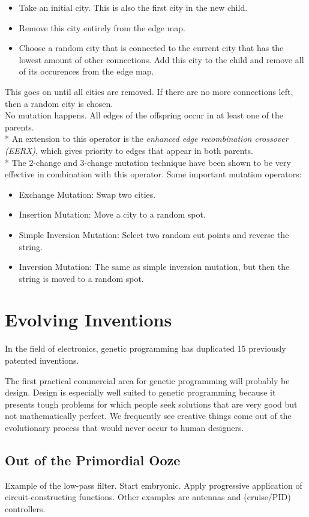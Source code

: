\documentclass[12pt]{article}
\begin{document}
\begin{itemize}
\begin{itemize}
\item Take an initial city. This is also the first city in the new child.
\item Remove this city entirely from the edge map.
\item Choose a random city that is connected to the current city that has the lowest amount of other connections. Add this city to the child and remove all of its occurences from the edge map.
\end{itemize}
This goes on until all cities are removed. If there are no more connections left, then a random city is chosen.\\
No mutation happens. All edges of the offspring occur in at least one of the parents.\\*
An extension to this operator is the \textit{enhanced edge recombination crossover (EERX)}, which gives priority to edges that appear in both parents.\\*
The $2$-change and $3$-change mutation technique have been shown to be very effective in combination with this operator. Some important mutation operators:
\begin{itemize}
\item Exchange Mutation: Swap two cities.
\item Insertion Mutation: Move a city to a random spot.
\item Simple Inversion Mutation: Select two random cut points and reverse the string.
\item Inversion Mutation: The same as simple inversion mutation, but then the string is moved to a random spot.
\end{itemize}
\end{itemize}
\clearpage

\appendix
\section{Evolving Inventions}
In the field of electronics, genetic programming has duplicated 15 previously patented inventions.

The first practical commercial area for genetic programming will probably be design. Design is especially well suited to genetic programming because it presents tough problems for which people seek solutions that are very good but not mathematically perfect. We frequently see creative things come out of the evolutionary process that would never occur to human designers.

\subsection{Out of the Primordial Ooze}
Example of the low-pass filter. Start embryonic. Apply progressive application of circuit-constructing functions. Other examples are antennas and (cruise/PID) controllers.
\end{document}
